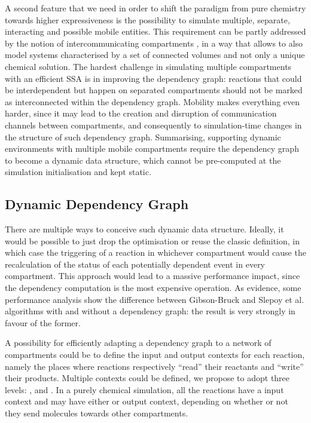 \documentclass[12pt,a4paper,twoside,openright]{book}
\begin{document}
A second feature that we need in order to shift the paradigm from pure chemistry towards higher expressiveness is the possibility to simulate multiple, separate, interacting and possible mobile entities.
%
This requirement can be partly addressed by the notion of intercommunicating compartments \cite{CiocchettaH09,versari08,montagna-cs2bio10,btssoc-jos7}, in a way that allows to also model systems characterised by a set of connected volumes and not only a unique chemical solution.
%
The hardest challenge in simulating multiple compartments with an efficient SSA is in improving the dependency graph: reactions that could be interdependent but happen on separated compartments should not be marked as interconnected within the dependency graph.
%
Mobility makes everything even harder, since it may lead to the creation and disruption of communication channels between compartments, and consequently to simulation-time changes in the structure of such dependency graph.
%
Summarising, supporting dynamic environments with multiple mobile compartments require the dependency graph to become a dynamic data structure, which cannot be pre-computed at the simulation initialisation and kept static.

\subsection{Dynamic Dependency Graph}

There are multiple ways to conceive such dynamic data structure.
%
Ideally, it would be possible to just drop the optimisation or reuse the classic definition, in which case the triggering of a reaction in whichever compartment would cause the recalculation of the status of each potentially dependent event in every compartment.
%
This approach would lead to a massive performance impact, since the dependency computation is the most expensive operation.
%
As evidence, some performance analysis \cite{slepoy2008} show the difference between Gibson-Bruck and Slepoy et al. algorithms with and without a dependency graph: the result is very strongly in favour of the former.

A possibility for efficiently adapting a dependency graph to a network of compartments could be to define the input and output contexts for each reaction, namely the places where reactions respectively ``read'' their reactants and ``write'' their products.
%
Multiple contexts could be defined, we propose to adopt three levels: \localc{}, \neighborhood{} and \globalc{}.
%
In a purely chemical simulation, all the reactions have a \localc{} input context and may have either \neighborhood{} or \localc{} output context, depending on whether or not they send molecules towards other compartments.
\end{document}
